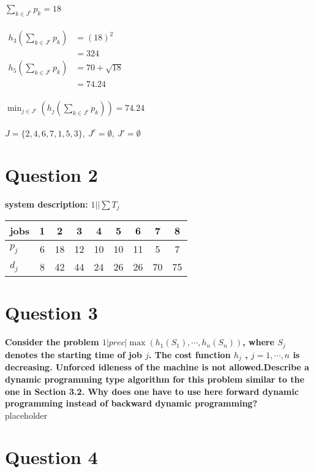 \documentclass[a4paper, fleqn]{article}
\begin{document}
\vspace{1pt}
$\sum_{k\in J^c}p_k=18$\\
\vspace{1pt}\\
$\begin{aligned}h_3\left(\sum_{k\in J^c}p_k\right)&=(18)^2\\&=324\end{aligned}$\\
$\begin{aligned}h_5\left(\sum_{k\in J^c}p_k\right)&=70+\sqrt{18}\\&=74.24\end{aligned}$\\
\vspace{1pt}\\
$\min_{j\in J'}\left(h_j\left(\sum_{k\in J^c}p_k\right)\right)=74.24$\\
\vspace{1pt}\\
$J=\{2,4,6,7,1,5,3\},\ J^c=\emptyset,\ J'=\emptyset$
\section{Question 2}
\textbf{system description: }$1||\sum T_j$
\begin{center}
\begin{tabular}{| l | c | c | c | c | c | c | c | c |}
\hline
jobs & 1 & 2 & 3 & 4 & 5 & 6 & 7 & 8\\
\hline
$p_j$ & 6 & 18 & 12 & 10 & 10 & 11 & 5 & 7 \\
$d_j$ & 8 & 42 & 44 & 24 & 26 & 26 & 70 & 75 \\
\hline
\end{tabular}
\end{center}
\section{Question 3}
\textbf{Consider the problem $1|prec| \max(h_1(S_1),\cdots , h_n(S_n))$, where $S_j$ denotes the starting time of job $j$. The cost function $h_j$ , $j = 1,\cdots,n$ is decreasing. Unforced idleness of the machine is not allowed.Describe a dynamic programming type algorithm for this problem similar to the one in Section 3.2. Why does one have to use here forward dynamic
programming instead of backward dynamic programming?}\\
placeholder
\section{Question 4}
\end{document}
